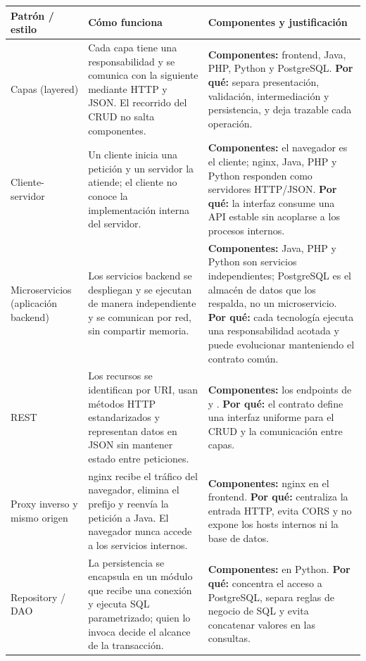 \begin{tabularx}{\textwidth}{p{}p{}Y}
\toprule
\textbf{Patrón / estilo} & \textbf{Cómo funciona} & \textbf{Componentes y justificación} \\
\midrule
Capas (layered) & Cada capa tiene una responsabilidad y se comunica con la siguiente mediante HTTP y JSON. El recorrido del CRUD no salta componentes. & \textbf{Componentes:} frontend, Java, PHP, Python y PostgreSQL. \textbf{Por qué:} separa presentación, validación, intermediación y persistencia, y deja trazable cada operación. \\
Cliente-servidor & Un cliente inicia una petición y un servidor la atiende; el cliente no conoce la implementación interna del servidor. & \textbf{Componentes:} el navegador es el cliente; nginx, Java, PHP y Python responden como servidores HTTP/JSON. \textbf{Por qué:} la interfaz consume una API estable sin acoplarse a los procesos internos. \\
Microservicios (aplicación backend) & Los servicios backend se despliegan y se ejecutan de manera independiente y se comunican por red, sin compartir memoria. & \textbf{Componentes:} Java, PHP y Python son servicios independientes; PostgreSQL es el almacén de datos que los respalda, no un microservicio. \textbf{Por qué:} cada tecnología ejecuta una responsabilidad acotada y puede evolucionar manteniendo el contrato común. \\
REST & Los recursos se identifican por URI, usan métodos HTTP estandarizados y representan datos en JSON sin mantener estado entre peticiones. & \textbf{Componentes:} los endpoints de  y . \textbf{Por qué:} el contrato define una interfaz uniforme para el CRUD y la comunicación entre capas. \\
Proxy inverso y mismo origen & nginx recibe el tráfico del navegador, elimina el prefijo  y reenvía la petición a Java. El navegador nunca accede a los servicios internos. & \textbf{Componentes:} nginx en el frontend. \textbf{Por qué:} centraliza la entrada HTTP, evita CORS y no expone los hosts internos ni la base de datos. \\
Repository / DAO & La persistencia se encapsula en un módulo que recibe una conexión y ejecuta SQL parametrizado; quien lo invoca decide el alcance de la transacción. & \textbf{Componentes:}  en Python. \textbf{Por qué:} concentra el acceso a PostgreSQL, separa reglas de negocio de SQL y evita concatenar valores en las consultas. \\
\bottomrule
\end{tabularx}

